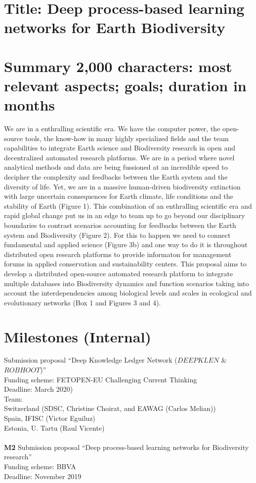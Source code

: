 \documentclass[authoryear,1p,12pt]{elsarticle}
\begin{document}
\section{{\bf Title: Deep process-based learning networks for Earth Biodiversity}}


\section{{\bf Summary} 2,000 characters: most relevant aspects; goals; duration in months}
We are in a enthralling scientific era. We have the computer power,
the open-source tools, the know-how in many highly specialized fields
and the team capabilities to integrate Earth science and Biodiversity
research in open and decentralized automated research platforms. We
are in a period where novel analytical methods and data are being
fussioned at an incredible speed to decipher the complexity and
feedbacks between the Earth system and the diversity of life. Yet, we
are in a massive human-driven biodiversity extinction with large
uncertain consequences for Earth climate, life conditions and the
stability of Earth (Figure 1). This combination of an enthralling
scientific era and rapid global change put us in an edge to team up to
go beyond our disciplinary boundaries to contrast scenarios accounting
for feedbacks between the Earth system and Biodiversity (Figure
2). For this to happen we need to connect fundamental and applied
science (Figure 3b) and one way to do it is throughout distributed
open research platforms to provide informaton for management forums in
applied conservation and sustainability centers. This proposal aims to
develop a distributed open-source automated research platform to
integrate multiple databases into Biodiversity dynamics and function
scenarios taking into account the interdependencies among biological
levels and scales in ecological and evolutionary networks (Box 1 and
Figures 3 and 4).


\section{{\bf Milestones (Internal)}}

 Submission proposal ``Deep Knowledge Ledger Network ($DEEPKLEN$ \& $ROBHOOT$)''\\
Funding scheme: FETOPEN-EU Challenging Current Thinking\\
Deadline: March 2020)\\
Team:\\
Switzerland (SDSC, Christine Choirat, and EAWAG (Carlos Melian))\\
Spain, IFISC (Victor Eguiluz)\\
Estonia, U. Tartu (Raul Vicente)\\
\\
{\bf M2} Submission proposal ``Deep process-based learning networks for Biodiversity research''\\
Funding scheme: BBVA\\
Deadline: November 2019\\
\end{document}

